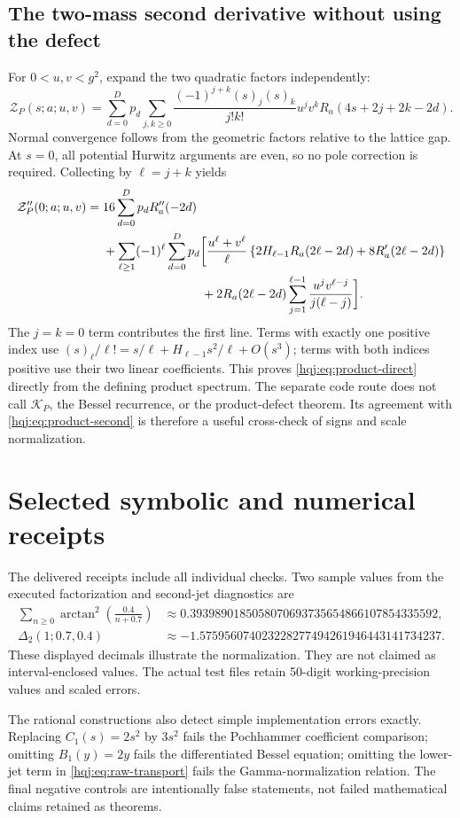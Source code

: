 \subsection{The two-mass second derivative without using the defect}
For $0<u,v<g^2$, expand the two quadratic factors independently:
\begin{equation}\label{hqj:eq:double-Pochhammer}
\mathcal Z_P(s;a;u,v)=
\sum_{d=0}^Dp_d\sum_{j,k\ge0}
\frac{(-1)^{j+k}(s)_j(s)_k}{j!k!}u^jv^k
R_a(4s+2j+2k-2d).
\end{equation}
Normal convergence follows from the geometric factors relative to
the lattice gap. At $s=0$, all potential Hurwitz arguments are even,
so no pole correction is required. Collecting by $\ell=j+k$ yields
\begin{align}
\mathcal Z_P''(0;a;u,v)
={}&16\sum_{d=0}^Dp_dR_a''(-2d)
\notag\\
&+\sum_{\ell\ge1}(-1)^\ell\sum_{d=0}^Dp_d
\biggl[\frac{u^\ell+v^\ell}{\ell}
\left\{2H_{\ell-1}R_a(2\ell-2d)+8R_a'(2\ell-2d)\right\}
\notag\\[-2pt]
&\hspace{28mm}+2R_a(2\ell-2d)
\sum_{j=1}^{\ell-1}\frac{u^jv^{\ell-j}}{j(\ell-j)}\biggr].
\label{hqj:eq:product-direct}
\end{align}
The $j=k=0$ term contributes the first line. Terms with exactly one
positive index use
$(s)_\ell/\ell!=s/\ell+H_{\ell-1}s^2/\ell+O(s^3)$;
terms with both indices positive use their two linear coefficients.
This proves \eqref{hqj:eq:product-direct} directly from the defining
product spectrum. The separate code route does not call
$\mathcal K_P$, the Bessel recurrence, or the product-defect theorem.
Its agreement with \eqref{hqj:eq:product-second} is therefore a useful
cross-check of signs and scale normalization.

\section{Selected symbolic and numerical receipts}
\label{hqj:sec:receipts}
The delivered receipts include all individual checks. Two sample values
from the executed factorization and second-jet diagnostics are
\begin{align*}
\sum_{n\ge0}\arctan^2\!\left(\frac{0.4}{n+0.7}\right)
&\approx0.3939890185058070693735654866107854335592,\\
\Delta_2(1;0.7,0.4)
&\approx-1.575956074023228277494261946443141734237.
\end{align*}
These displayed decimals illustrate the normalization. They are not
claimed as interval-enclosed values. The actual test files retain
50-digit working-precision values and scaled errors.

The rational constructions also detect simple implementation errors
exactly. Replacing $C_1(s)=2s^2$ by $3s^2$ fails the Pochhammer
coefficient comparison; omitting $B_1(y)=2y$ fails the differentiated
Bessel equation; omitting the lower-jet term in
\eqref{hqj:eq:raw-transport} fails the Gamma-normalization relation.
The final negative controls are intentionally false statements, not
failed mathematical claims retained as theorems.

